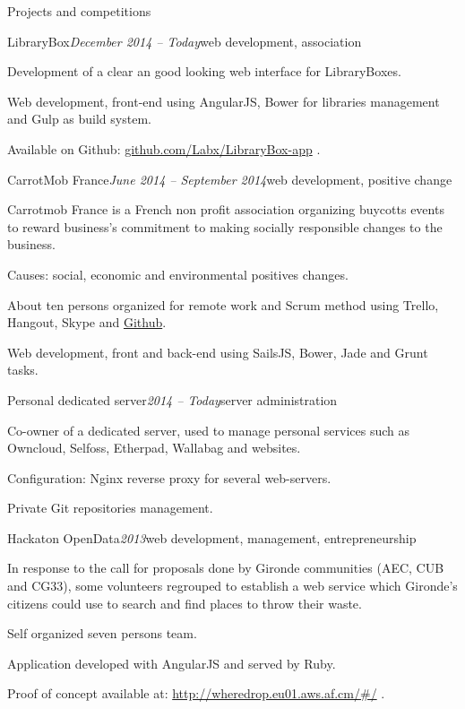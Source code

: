 \begin{rSection}{Projects and competitions}

  \begin{rSubsection}{LibraryBox}{\em December 2014 -- Today}{web development, association}{}
    \item[] Development of a clear an good looking web interface for LibraryBoxes.
    \item Web development, front-end using AngularJS, Bower for libraries management and Gulp as build system.
    \item Available on Github: \href{https://github.com/Labx/LibraryBox-app}{github.com/Labx/LibraryBox-app} .
  \end{rSubsection}

  \begin{rSubsection}{CarrotMob France}{\em June 2014 -- September 2014}{web development, positive change}{}
    \item[] Carrotmob France is a French non profit association organizing buycotts events to reward business's commitment to making socially responsible changes to the business.
    \item Causes: social, economic and environmental positives changes.
    \item About ten persons organized for remote work and Scrum method using Trello, Hangout, Skype and \href{https://github.com/carrotcommunity/carrotmobfrance}{Github}.
    \item Web development, front and back-end using SailsJS, Bower, Jade and Grunt tasks.
  \end{rSubsection}

  \begin{rSubsection}{Personal dedicated server}{\em 2014 -- Today}{server administration}{}
    \item[] Co-owner of a dedicated server, used to manage personal services such as Owncloud, Selfoss, Etherpad, Wallabag and websites.
    \item Configuration: Nginx reverse proxy for several web-servers.
    \item Private Git repositories management.
  \end{rSubsection}

  \begin{rSubsection}{Hackaton OpenData}{\em 2013}{web development, management, entrepreneurship}{}
    \item[] In response to the call for proposals done by Gironde communities (AEC, CUB and CG33), some volunteers regrouped to establish a web service which Gironde's citizens could use to search and find places to throw their waste.
    \item Self organized seven persons team.
    \item Application developed with AngularJS and served by Ruby.
    \item Proof of concept available at: \href{http://wheredrop.eu01.aws.af.cm/#/}{http://wheredrop.eu01.aws.af.cm/\#/} .
  \end{rSubsection}


\end{rSection}
